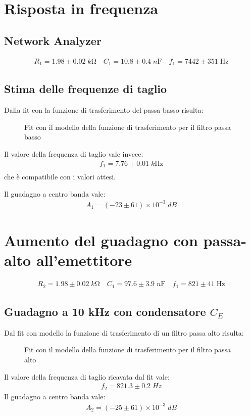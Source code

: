 \documentclass[10pt,a4paper]{article}
\begin{document}
\section{Risposta in frequenza}

\subsection{Network Analyzer}
\begin{align*}
R_1 = 1.98 \pm 0.02 \; \si{k\ohm} \quad C_1 = 10.8 \pm 0.4 \; \si{n\F} \quad
f_1 = 7442 \pm 351 \; \si{\Hz}
\end{align*}

\subsection{Stima delle frequenze di taglio}
Dalla fit con la funzione di trasferimento del passa basso risulta:
\begin{figure}[htb]
\centering
\caption{Fit con il modello della funzione di trasferimento per il filtro passa basso}
\end{figure}
Il valore della frequenza di taglio vale invece:
\begin{align*}
f_1 = 7.76 \pm 0.01 \; \si{k\Hz}\\
\end{align*}
che è compatibile con i valori attesi.

Il guadagno a centro banda vale:
\begin{align*}
A_1 = (-23 \pm 61) \times 10^{-3} \; \si{dB}
\end{align*}

\section{Aumento del guadagno con passa-alto all'emettitore}
\begin{align*}
R_2 = 1.98 \pm 0.02 \; \si{k\ohm} \quad C_1 = 97.6 \pm 3.9 \; \si{n\F} \quad
f_1 = 821 \pm 41 \; \si{\Hz}
\end{align*}

\subsection{Guadagno a 10 kHz con condensatore $C_E$}
Dal fit con modello la funzione di trasferimento di un filtro passa alto risulta:
\begin{figure}[htb]
\centering
\caption{Fit con il modello della funzione di trasferimento per il filtro passa alto}
\end{figure}
Il valore della frequenza di taglio ricavata dal fit vale:
\begin{align*}
f_2 = 821.3 \pm 0.2 \; \si{Hz}
\end{align*}
Il guadagno a centro banda vale:
\begin{align*}
A_2 = (-25 \pm 61) \times 10^{-3} \; \si{dB}
\end{align*}
\end{document}
